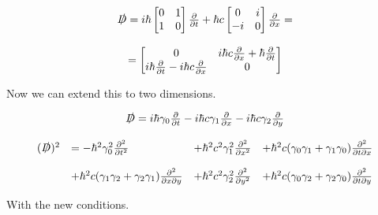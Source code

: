 \begin{equation}
  \begin{array}{c}
    \slashed{D} = i\hbar\begin{bmatrix}
      0 & 1\\
      1 & 0\end{bmatrix} \frac{\partial}{\partial t} + \hbar c \begin{bmatrix}
      0 & i\\
      -i & 0\end{bmatrix} \frac{\partial}{\partial x} =
      \\

      \\
      = \begin{bmatrix}
      0 & i\hbar c \frac{\partial}{\partial x} + \hbar \frac{\partial}{\partial t}\\
      i\hbar \frac{\partial}{\partial t} - i\hbar c \frac{\partial}{\partial x} & 0\end{bmatrix}
  \end{array}
\end{equation}

Now we can extend this to two dimensions.

\begin{equation}
  \begin{array}{c}
  \slashed{D} = i\hbar\gamma_0 \frac{\partial}{\partial t} - i\hbar c \gamma_1 \frac{\partial}{\partial x} - i\hbar c\gamma_2 \frac{\partial}{\partial y}
  \\

  \\
  \begin{array}{llll}
    (\slashed{D})^2 &= -\hbar^2 \gamma_0^2 \frac{\partial^2}{\partial t^2} &+ \hbar^2 c^2 \gamma_1^2 \frac{\partial^2}{\partial x^2} &+ \hbar^2 c (\gamma_0\gamma_1 + \gamma_1\gamma_0)\frac{\partial^2}{\partial t \partial x}
    \\

    \\
                    &+ \hbar^2 c (\gamma_1\gamma_2 + \gamma_2\gamma_1)\frac{\partial^2}{\partial x \partial y}  &+\hbar^2 c^2 \gamma_2^2 \frac{\partial^2}{\partial y^2}  &+ \hbar^2 c (\gamma_0\gamma_2 + \gamma_2\gamma_0)\frac{\partial^2}{\partial t \partial y}
  \end{array}
\end{array}
\end{equation}

With the new conditions.

